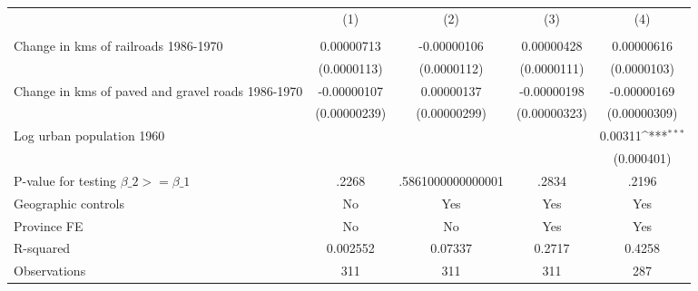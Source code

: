 {
\def\sym#1{\ifmmode^{#1}\else\(^{#1}\)\fi}
\begin{tabular}{l*{4}{c}}
\hline\hline
                &\multicolumn{1}{c}{(1)}&\multicolumn{1}{c}{(2)}&\multicolumn{1}{c}{(3)}&\multicolumn{1}{c}{(4)}\\
                &\multicolumn{1}{c}{}&\multicolumn{1}{c}{}&\multicolumn{1}{c}{}&\multicolumn{1}{c}{}\\
\hline
Change in kms of railroads 1986-1970&0.00000713         &-0.00000106         &0.00000428         &0.00000616         \\
                &(0.0000113)         &(0.0000112)         &(0.0000111)         &(0.0000103)         \\
[1em]
Change in kms of paved and gravel roads 1986-1970&-0.00000107         &0.00000137         &-0.00000198         &-0.00000169         \\
                &(0.00000239)         &(0.00000299)         &(0.00000323)         &(0.00000309)         \\
[1em]
Log urban population 1960&                  &                  &                  &  0.00311\sym{***}\\
                &                  &                  &                  &(0.000401)         \\
\hline
P-value for testing $\beta\_{2} >= \beta\_{1}$&    .2268         &.5861000000000001         &    .2834         &    .2196         \\
Geographic controls&       No         &      Yes         &      Yes         &      Yes         \\
Province FE     &       No         &       No         &      Yes         &      Yes         \\
R-squared       & 0.002552         &  0.07337         &   0.2717         &   0.4258         \\
Observations    &      311         &      311         &      311         &      287         \\
\hline\hline
\end{tabular}
}
